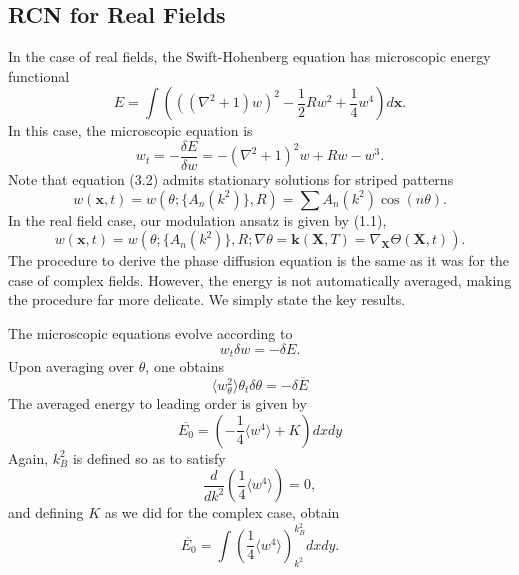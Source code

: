\documentclass[12pt]{article}
\numberwithin{equation}{section}
\begin{document}
\subsection{RCN for Real Fields}
In the case of real fields, the Swift-Hohenberg equation has microscopic energy functional
\begin{equation}
E = \int \left( ((\nabla^2+1)w)^2-\frac{1}{2}Rw^2 + \frac{1}{4}w^4 \right)d\bm{x}.
\end{equation}
In this case, the microscopic equation is
\begin{equation}
w_t = -\frac{\delta E}{\delta w} = -(\nabla^2+1)^2w + Rw - w^3.
\end{equation}
Note that equation (3.2) admits stationary solutions for striped patterns
\begin{equation}
w(\bm{x},t) = w(\theta; \{A_n(k^2)\},R) = \sum A_n(k^2)\cos(n\theta).
\end{equation}
In the real field case, our modulation ansatz is given by (1.1),
\begin{equation}
w(\bm{x},t) = w(\theta; \{A_n(k^2)\},R; \nabla \theta = \bm{k}(\bm{X},T)=\nabla_{\bm{X}}\Theta(\bm{X},t)).
\end{equation}
The procedure to derive the phase diffusion equation is the same as it was for the case of complex fields. However, the energy is not automatically averaged, making the procedure far more delicate. We simply state the key results.
\par
The microscopic equations evolve according to
\begin{equation}
 w_t \delta w = -\delta E.
\end{equation}
Upon averaging over $\theta$, one obtains
\begin{equation}
 \langle w_{\theta}^2\rangle\theta_t \delta \theta = -\delta \overline{E}
\end{equation}
The averaged energy to leading order is given by
\begin{equation}
\overline{E_0} = \left(-\frac{1}{4}\langle w^4 \rangle + K \right)dxdy
\end{equation}
Again, $k^2_B$ is defined so as to satisfy
\begin{equation}
\frac{d}{dk^2}\left(\frac{1}{4}\langle w^4 \rangle\right) = 0,
\end{equation}
and defining $K$ as we did for the complex case, obtain
\begin{equation}
\overline{E_0} = \int \left( \frac{1}{4}\langle w^4 \rangle\right)_{k^2}^{k^2_B}dxdy.
\end{equation}
\end{document}
